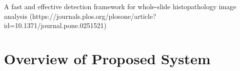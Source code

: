 \documentclass{comjnl}
\begin{document}

A fast and effective detection framework for whole-slide histopathology image analysis (https://journals.plos.org/plosone/article?id=10.1371/journal.pone.0251521)

\section{Overview of Proposed System}
\end{document}
